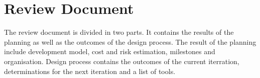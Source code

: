 \section*{Review Document}
The review document is divided in two parts.
It contains the results of the planning as well as the outcomes of the design process.
The result of the planning include development model, cost and risk estimation, milestones and organisation.
Design process contains the outcomes of the current iterration, determinations for the next iteration and a list of tools.


